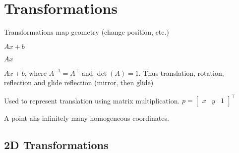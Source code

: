 \section{Transformations}

Transformations map geometry (change position, etc.)

\begin{definition}
  \(Ax + b\)
\end{definition}

\begin{definition}[Linear]
  \(Ax\)
\end{definition}

\begin{definition}[Rigid]
  \(Ax + b\), where \(A^{-1} = A^\top\) and \(\det(A) = 1\). Thus translation, rotation, reflection and glide reflection (mirror, then glide)
\end{definition}

\begin{definition}
  Used to represent translation using matrix multiplication. \(p = \begin{bmatrix}
    x & y & 1
  \end{bmatrix}^\top\)
\end{definition}

\begin{theorem}
  A point ahs infinitely many homogeneous coordinates.
\end{theorem}

\subsection{2D Transformations}

